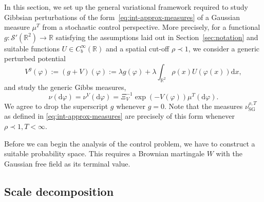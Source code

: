 \documentclass[11pt, a4paper]{scrartcl}
\numberwithin{equation}{section}
\theoremstyle{plain}
\theoremstyle{remark}
\newcommand{\assign}{:=}
\newcommand{\mathd}{\mathrm{d}}
\newcommand{\tmop}[1]{\ensuremath{\operatorname{#1}}}
\begin{document}
In this section, we set up the general variational framework required to study
Gibbsian perturbations of the form~\eqref{eq:int-approx-measures} of a
Gaussian measure $\mu^T$ from a stochastic control perspective. More
precisely, for a functional $g : \mathcal{S}' (\mathbb{R}^2) \rightarrow
	\mathbb{R}$ satisfying the assumptions laid out in Section~\ref{sec:notation}
and suitable functions $U \in C^{\infty}_b (\mathbb{R})$ and a spatial cut-off
$\rho \prec 1$, we consider a generic perturbed potential
\begin{equation}
	V^g (\varphi) \assign (g + V) (\varphi) \assign \lambda g (\varphi) +
	\lambda \int_{\mathbb{R}^2} \rho (x) U (\varphi (x)) \mathd x,
	\label{eq:def-Vf}
\end{equation}
and study the generic Gibbs measures,
\begin{equation}
	\nu (\mathd \varphi) = \nu^V (\mathd \varphi) = \Xi_V^{- 1} \exp (- V
	(\varphi)) \mu^T (\mathd \varphi) . \label{eq:nu-general-pot}
\end{equation}
We agree to drop the superscript $g$ whenever $g = 0$. Note that the measures
$\nu_{\tmop{SG}}^{\rho, T}$ as defined in \eqref{eq:int-approx-measures} are
precisely of this form whenever $\rho\prec1, T<\infty$.

Before we can begin the analysis of the control problem, we have to construct
a suitable probability space. This requires a Brownian martingale $W$ with the
Gaussian free field as its terminal value.

\subsection{Scale decomposition}
\end{document}
